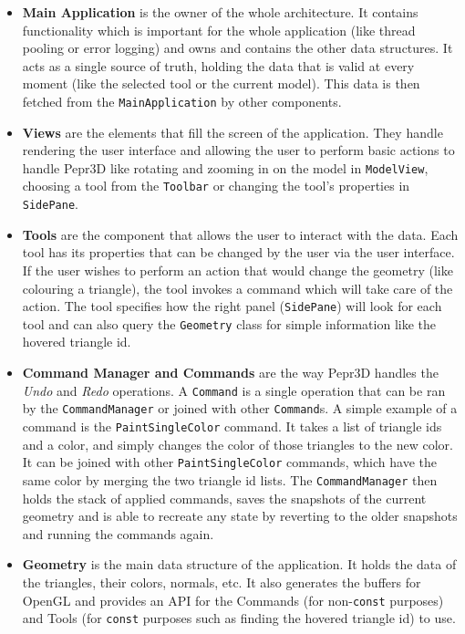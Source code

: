 \begin{itemize}
\item \textbf{Main Application} is the owner of the whole architecture. It contains functionality which is important for the whole application (like thread pooling or error logging) and owns and contains the other data structures. It acts as a single source of truth, holding the data that is valid at every moment (like the selected tool or the current model). This data is then fetched from the \texttt{MainApplication} by other components.

\item \textbf{Views} are the elements that fill the screen of the application. They handle rendering the user interface and allowing the user to perform basic actions to handle Pepr3D like rotating and zooming in on the model in \texttt{ModelView}, choosing a tool from the \texttt{Toolbar} or changing the tool's properties in \texttt{SidePane}.

\item \textbf{Tools} are the component that allows the user to interact with the data. Each tool has its properties that can be changed by the user via the user interface. If the user wishes to perform an action that would change the geometry (like colouring a triangle), the tool invokes a command which will take care of the action. The tool specifies how the right panel (\texttt{SidePane}) will look for each tool and can also query the \texttt{Geometry} class for simple information like the hovered triangle id.

\item \textbf{Command Manager and Commands} are the way Pepr3D handles the \textit{Undo} and \textit{Redo} operations. A \texttt{Command} is a single operation that can be ran by the \texttt{CommandManager} or joined with other \texttt{Command}s. A simple example of a command is the \texttt{PaintSingleColor} command. It takes a list of triangle ids and a color, and simply changes the color of those triangles to the new color. It can be joined with other \texttt{PaintSingleColor} commands, which have the same color by merging the two triangle id lists. The \texttt{CommandManager} then holds the stack of applied commands, saves the snapshots of the current geometry and is able to recreate any state by reverting to the older snapshots and running the commands again.

\item \textbf{Geometry} is the main data structure of the application. It holds the data of the triangles, their colors, normals, etc. It also generates the buffers for OpenGL and provides an API for the Commands (for non-\texttt{const} purposes) and Tools (for \texttt{const} purposes such as finding the hovered triangle id) to use.
\end{itemize}

